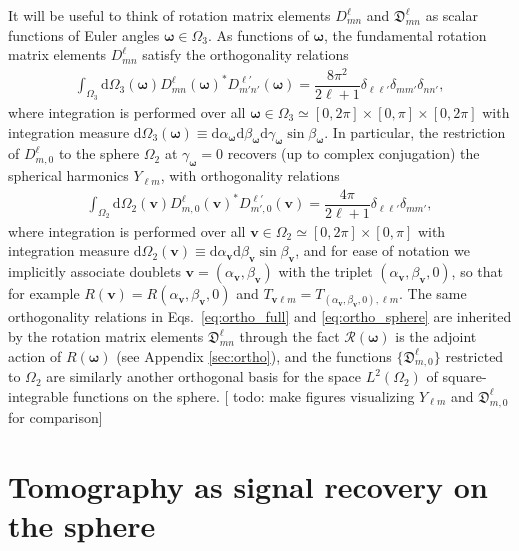\documentclass[notitlepage,twocolumn]{revtex4-2}
\newcommand{\f}[2]{\dfrac{#1}{#2}} %
\newcommand{\p}[1]{\left(#1\right)} %
\renewcommand{\set}[1]{\{#1\}} %
\renewcommand{\v}{\bm} %
\newcommand{\1}{\mathds{1}}
\newcommand{\R}{\mathcal{R}}
\newcommand{\D}{\mathfrak{D}}
\renewcommand{\d}{\text{d}}
\newcommand{\red}[1]{{\color{red} #1}}
\begin{document}
It will be useful to think of rotation matrix elements $D^\ell_{mn}$ and $\D^\ell_{mn}$ as scalar functions of Euler angles $\v\omega\in\Omega_3$.
As functions of $\v\omega$, the fundamental rotation matrix elements $D_{mn}^\ell$ satisfy the orthogonality relations \cite{brown2003rotational}
\begin{align}
  \int_{\Omega_3} \d\Omega_3\p{\v\omega}
  D^{\ell}_{mn}\p{\v\omega}^* D^{\ell'}_{m'n'}\p{\v\omega}
  = \f{8\pi^2}{2\ell+1} \delta_{\ell\ell'} \delta_{mm'} \delta_{nn'},
  \label{eq:ortho_full}
\end{align}
where integration is performed over all $\v\omega\in\Omega_3\simeq[0,2\pi]\times[0,\pi]\times[0,2\pi]$ with integration measure $\d\Omega_3\p{\v\omega} \equiv \d\alpha_{\v\omega} \d\beta_{\v\omega} \d\gamma_{\v\omega} \sin\beta_{\v\omega}$.
In particular, the restriction of $D^\ell_{m,0}$ to the sphere $\Omega_2$ at $\gamma_{\v\omega}=0$ recovers (up to complex conjugation) the spherical harmonics $Y_{\ell m}$, with orthogonality relations
\begin{align}
  \int_{\Omega_2} \d\Omega_2\p{\v v}
  D^{\ell}_{m,0}\p{\v v}^* D^{\ell'}_{m',0}\p{\v v}
  = \f{4\pi}{2\ell+1} \delta_{\ell\ell'} \delta_{mm'},
  \label{eq:ortho_sphere}
\end{align}
where integration is performed over all $\v v\in\Omega_2\simeq[0,2\pi]\times[0,\pi]$ with integration measure $\d\Omega_2\p{\v v} \equiv \d\alpha_{\v v} \d\beta_{\v v} \sin\beta_{\v v}$, and for ease of notation we implicitly associate doublets $\v v=\p{\alpha_{\v v},\beta_{\v v}}$ with the triplet $\p{\alpha_{\v v},\beta_{\v v},0}$, so that for example $R\p{\v v} = R\p{\alpha_{\v v},\beta_{\v v},0}$ and $T_{\v v\ell m} = T_{\p{\alpha_{\v v},\beta_{\v v},0},\ell m}$.
The same orthogonality relations in Eqs.~\eqref{eq:ortho_full} and \eqref{eq:ortho_sphere} are inherited by the rotation matrix elements $\D_{mn}^\ell$ through the fact $\R\p{\v\omega}$ is the adjoint action of $R\p{\v\omega}$ (see Appendix \ref{sec:ortho}), and the functions $\set{\D_{m,0}^\ell}$ restricted to $\Omega_2$ are similarly another orthogonal basis for the space $L^2\p{\Omega_2}$ of square-integrable functions on the sphere.
[\red{todo: make figures visualizing $Y_{\ell m}$ and $\D^\ell_{m,0}$ for comparison}]

\section{Tomography as signal recovery on the sphere}
\label{sec:signal_recovery}
\end{document}
